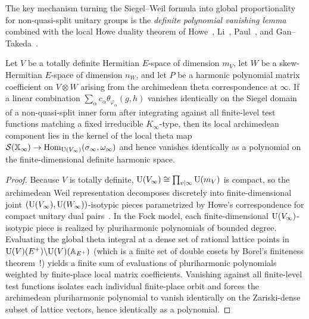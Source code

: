 The key mechanism turning the Siegel--Weil formula into global proportionality for non-quasi-split unitary groups is the \emph{definite polynomial vanishing lemma} combined with the local Howe duality theorem of Howe~\cite{Howe1989}, Li~\cite{Li1992}, Paul~\cite{Paul1998}, and Gan--Takeda~\cite{GanTakeda2016}.

\begin{lemma}
\label{lem:11:pol-zero}
Let $V$ be a totally definite Hermitian $E$-space of dimension $m_V$, let $W$ be a skew-Hermitian $E$-space of dimension $n_W$, and let $P$ be a harmonic polynomial matrix coefficient on $V \otimes W$ arising from the archimedean theta correspondence at $\infty$. If a linear combination $\sum_\alpha c_\alpha \theta_{\varphi_\alpha}(g, h)$ vanishes identically on the Siegel domain of a non-quasi-split inner form after integrating against all finite-level test functions matching a fixed irreducible $K_\infty$-type, then its local archimedean component lies in the kernel of the local theta map $\mathcal{S}(\mathbb{X}_\infty) \to \operatorname{Hom}_{\mathrm{U}(V_\infty)}(\sigma_\infty, \omega_\infty)$ and hence vanishes identically as a polynomial on the finite-dimensional definite harmonic space.
\end{lemma}

\begin{proof}
Because $V$ is totally definite, $\mathrm{U}(V_\infty) \cong \prod_{v \mid \infty} \mathrm{U}(m_V)$ is compact, so the archimedean Weil representation decomposes discretely into finite-dimensional joint $(\mathrm{U}(V_\infty), \mathrm{U}(W_\infty))$-isotypic pieces parametrized by Howe's correspondence for compact unitary dual pairs~\cite{Howe1989,Li1992,Paul1998}. In the Fock model, each finite-dimensional $\mathrm{U}(V_\infty)$-isotypic piece is realized by pluriharmonic polynomials of bounded degree. Evaluating the global theta integral at a dense set of rational lattice points in $\mathrm{U}(V)(E^+) \backslash \mathrm{U}(V)(\mathbb{A}_{E^+})$ (which is a finite set of double cosets by Borel's finiteness theorem~\cite{Borel1969}!) yields a finite sum of evaluations of pluriharmonic polynomials weighted by finite-place local matrix coefficients. Vanishing against all finite-level test functions isolates each individual finite-place orbit and forces the archimedean pluriharmonic polynomial to vanish identically on the Zariski-dense subset of lattice vectors, hence identically as a polynomial.
\end{proof}

